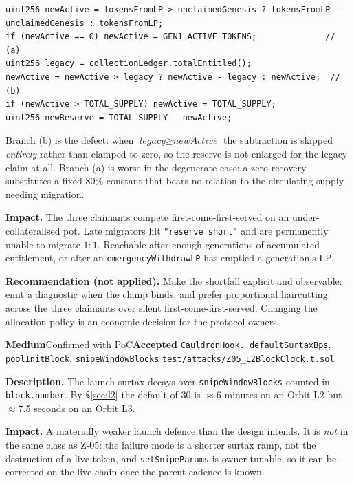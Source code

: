 \documentclass[10pt,a4paper]{article}
\newcommand{\sev}[2]{\textcolor{#1}{\textbf{#2}}}
\newcommand{\SevMed}{\sev{med}{Medium}}
\newcommand{\Accepted}{\textcolor{info}{\textbf{Accepted}}}
\newcommand{\code}[1]{\texttt{\small #1}}
\begin{document}
\begin{lstlisting}
uint256 newActive = tokensFromLP > unclaimedGenesis ? tokensFromLP - unclaimedGenesis : tokensFromLP;
if (newActive == 0) newActive = GEN1_ACTIVE_TOKENS;              // (a)
uint256 legacy = collectionLedger.totalEntitled();
newActive = newActive > legacy ? newActive - legacy : newActive;  // (b)
if (newActive > TOTAL_SUPPLY) newActive = TOTAL_SUPPLY;
uint256 newReserve = TOTAL_SUPPLY - newActive;
\end{lstlisting}

Branch (b) is the defect: when $\textit{legacy} \ge \textit{newActive}$ the subtraction is
skipped \emph{entirely} rather than clamped to zero, so the reserve is not enlarged for the
legacy claim at all. Branch (a) is worse in the degenerate case: a zero recovery
substitutes a fixed 80\% constant that bears no relation to the circulating supply needing
migration.

\textbf{Impact.} The three claimants compete first-come-first-served on an
under-collateralised pot. Late migrators hit \code{"reserve short"} and are permanently
unable to migrate $1{:}1$. Reachable after enough generations of accumulated entitlement, or
after an \code{emergencyWithdrawLP} has emptied a generation's LP.

\textbf{Recommendation (not applied).} Make the shortfall explicit and observable: emit a
diagnostic when the clamp binds, and prefer proportional haircutting across the three
claimants over silent first-come-first-served. Changing the allocation policy is an
economic decision for the protocol owners.

{\SevMed}{Confirmed with PoC}{\Accepted}
{\code{CauldronHook.\_defaultSurtaxBps}, \code{poolInitBlock}, \code{snipeWindowBlocks}}
{\code{test/attacks/Z05\_L2BlockClock.t.sol}}

\textbf{Description.} The launch surtax decays over \code{snipeWindowBlocks} counted in
\code{block.number}. By \S\ref{sec:l2} the default of 30 is $\approx$6 minutes on an Orbit
L2 but $\approx$7.5 seconds on an Orbit L3.

\textbf{Impact.} A materially weaker launch defence than the design intends. It is
\emph{not} in the same class as Z-05: the failure mode is a shorter surtax ramp, not the
destruction of a live token, and \code{setSnipeParams} is owner-tunable, so it can be
corrected on the live chain once the parent cadence is known.
\end{document}
